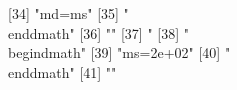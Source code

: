 [34] "{md}={ms}"                                                                                                                                                                         
[35] "\\end{dmath}"                                                                                                                                                                      
[36] ""                                                                                                                                                                                  
[37] "%
[38] "\\begin{dmath}"                                                                                                                                                                    
[39] "{ms}=2e+02"                                                                                                                                                                        
[40] "\\end{dmath}"                                                                                                                                                                      
[41] ""                                                                                                                                                                                  
